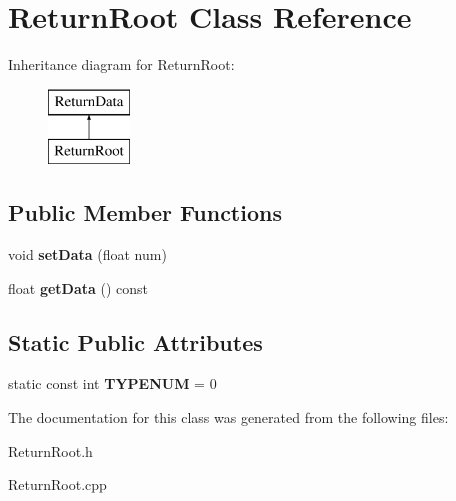 \hypertarget{class_return_root}{\section{Return\-Root Class Reference}
\label{class_return_root}
}
Inheritance diagram for Return\-Root\-:\begin{figure}[H]
\begin{center}
\leavevmode
\includegraphics[height=2.000000cm]{class_return_root}
\end{center}
\end{figure}
\subsection*{Public Member Functions}
\begin{DoxyCompactItemize}
\item 
\hypertarget{class_return_root_aee0234acc3e276cee21e7acd2e51f4b9}{void {\bfseries set\-Data} (float num)}\label{class_return_root_aee0234acc3e276cee21e7acd2e51f4b9}

\item 
\hypertarget{class_return_root_a3514cad08617cef13e9a2671196ca0b9}{float {\bfseries get\-Data} () const }\label{class_return_root_a3514cad08617cef13e9a2671196ca0b9}

\end{DoxyCompactItemize}
\subsection*{Static Public Attributes}
\begin{DoxyCompactItemize}
\item 
\hypertarget{class_return_root_af8b144313269a7cc5475dcc8c3b69da4}{static const int {\bfseries T\-Y\-P\-E\-N\-U\-M} = 0}\label{class_return_root_af8b144313269a7cc5475dcc8c3b69da4}

\end{DoxyCompactItemize}


The documentation for this class was generated from the following files\-:\begin{DoxyCompactItemize}
\item 
Return\-Root.\-h\item 
Return\-Root.\-cpp\end{DoxyCompactItemize}
